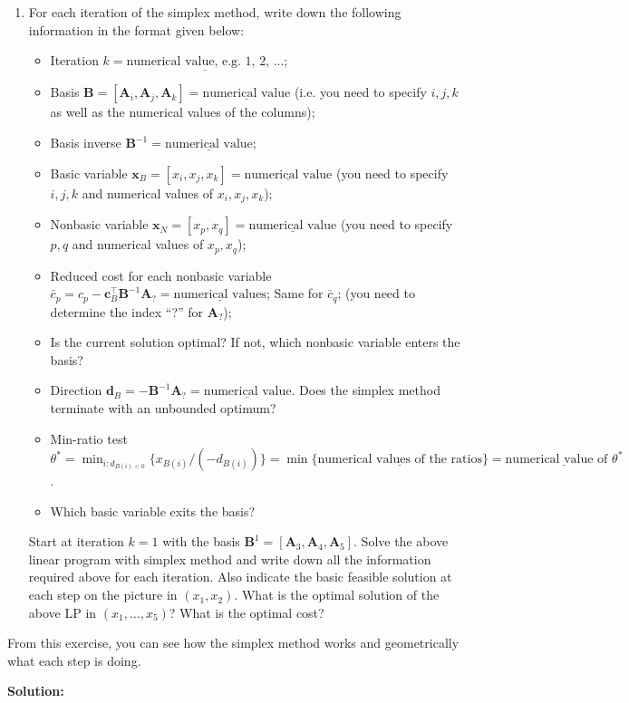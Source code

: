 \documentclass[11pt]{article}
\newcommand{\mb}[1]{\ensuremath{\boldsymbol{#1}}}
\begin{document}
\begin{enumerate}
\begin{enumerate}
	\item For each iteration of the simplex method, write down the following information in the format given below:
	\begin{itemize}
		\item Iteration $k=\underline{\text{numerical value, e.g. 1, 2, ...}}$;
		\item Basis $\mb{B} = [\mb{A}_i,\mb{A}_j,\mb{A}_k]=\underline{\text{numerical value}}$ (i.e. you need to specify $i,j,k$ as well as the numerical values of the columns);
		\item Basis inverse $\mb{B}^{-1} = \underline{\text{numerical value}}$;
		\item Basic variable $\mb{x}_B = [x_i, x_j, x_k] = \underline{\text{numerical value}}$ (you need to specify $i,j,k$ and numerical values of $x_i,x_j,x_k$);
		\item Nonbasic variable $\mb{x}_N = [x_p, x_q] = \underline{\text{numerical value}}$ (you need to specify $p,q$ and numerical values of $x_p,x_q$);
		\item Reduced cost for each nonbasic variable $\bar{c}_p = c_p - \mb{c}_B^\top\mb{B}^{-1}\mb{A}_? = \underline{\text{numerical values}}$; Same for $\bar{c}_q$; (you need to determine the index ``?'' for $\mb{A}_?$);
		\item Is the current solution optimal? If not, which nonbasic variable enters the basis?
		\item Direction $\mb{d}_B = -\mb{B}^{-1}\mb{A}_?=\underline{\text{numerical value}}$. Does the simplex method terminate with an unbounded optimum?
		\item Min-ratio test $\theta^* = \min_{i : {d}_{B(i)<0}}\{x_{B(i)}/(-d_{B(i)})\}=\min\{\underline{\text{numerical values of the ratios}}\}=\underline{\text{numerical value of $\theta^*$}}$. 
		\item Which basic variable exits the basis?
	\end{itemize}
	Start at iteration $k=1$ with the basis $\mb{B}^1=[\mb{A}_3,\mb{A}_4,\mb{A}_5]$. Solve the above linear program with simplex method and write down all the information required above for each iteration. Also indicate the basic feasible solution at each step on the picture in $(x_1, x_2)$. What is the optimal solution of the above LP in $(x_1, \dots, x_5)$? What is the optimal cost?
\end{enumerate}
From this exercise, you can see how the simplex method works and geometrically what each step is doing. 

\textbf{Solution:}


\end{enumerate}
\end{document}
